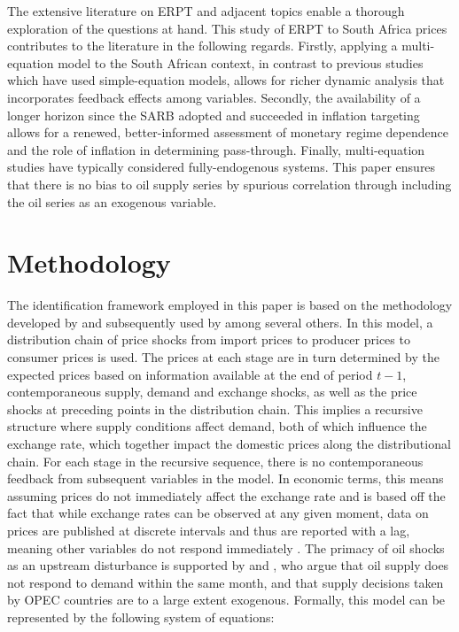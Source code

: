\documentclass[12pt]{article}
\begin{document}
The extensive literature on ERPT and adjacent topics enable a thorough exploration of the questions at hand. This study of ERPT to South Africa prices contributes to the literature in the following regards. Firstly, applying a multi-equation model to the South African context, in contrast to previous studies which have used simple-equation models, allows for richer dynamic analysis that incorporates feedback effects among variables. Secondly, the availability of a longer horizon since the SARB adopted and succeeded in inflation targeting allows for a renewed, better-informed assessment of monetary regime dependence and the role of inflation in determining pass-through. Finally, multi-equation studies have typically considered fully-endogenous systems. This paper ensures that there is no bias to oil supply series by spurious correlation through including the oil series as an exogenous variable. 

\pagebreak

\section{Methodology}

The identification framework employed in this paper is based on the methodology developed by \textcite{mccarthy1999} and subsequently used by \textcite{choudhri2015exchange} among several others. In this model, a distribution chain of price shocks from import prices to producer prices to consumer prices is used. The prices at each stage are in turn determined by the expected prices based on information available at the end of period $t-1$, contemporaneous supply, demand  and exchange shocks, as well as the price shocks at preceding points in the distribution chain. This implies a recursive structure where supply conditions affect demand, both of which influence the exchange rate, which together impact the domestic prices along the distributional chain. For each stage in the recursive sequence, there is no contemporaneous feedback from subsequent variables in the model. In economic terms, this means assuming prices do not immediately affect the exchange rate and is based off the fact that while exchange rates can be observed at any given moment, data on prices are published at discrete intervals and thus are reported with a lag, meaning other variables do not respond immediately \parencite{choudhri2005explaining}. The primacy of oil shocks as an upstream disturbance is supported by \textcite{kilian2009} and \textcite{Kanzig}, who argue that oil supply does not respond to demand within the same month, and that supply decisions taken by OPEC countries are to a large extent exogenous. Formally, this model can be represented by the following  system of equations:
\end{document}
